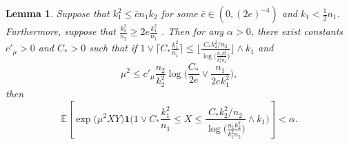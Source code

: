\documentclass{article}
\newcommand{\EE}{\mathbb{E}}
\newcommand{\one}{\mathbf{1}}
\newcommand{\Ct}{C_{*}}
\newcommand{\ju}[1]{{\color{blue}Julien: #1}}
\newtheorem{lemma}{Lemma}
\begin{document}
\begin{lemma}\label{lem_lb_s2d2big_maxlin}
    Suppose that $k_1^2 \leq \bar{c}n_1k_2$ for some $\bar{c} \in (0, (2e)^{-4})$ and $k_1 < \frac12 n_1$. 
    Furthermore, suppose that $\frac{k^2_2}{n_2} \geq 2e\frac{k_1^2}{n_1}$ . Then for any $\alpha > 0$, there exist constants $c'_{\mu} > 0$ and $\Ct > 0$ such that if $1 \vee \lceil \Ct \frac{k_1^2}{n_1}\rceil \leq \big\lfloor \frac{\Ct k_2^2/n_2}{\log\big(\frac{n_1k_2^2}{k_1^2n_2}\big)}\big\rfloor\wedge k_1$ and
    \[\mu^2 \leq c'_\mu \frac{n_2}{k_2^2}\log\big(\frac{\Ct}{2e}\vee \frac{n_1}{2ek^2_1}\big),\]
    then
    \[\EE\left[\exp\big(\mu^2XY\big)\one\bigg(1 \vee \Ct \frac{k_1^2}{n_1} \leq X \leq \frac{\Ct k_2^2/n_2}{\log\big(\frac{n_1k_2^2}{k_1^2n_2}\big)}\wedge k_1\bigg)\right] < \alpha.\]
\end{lemma}
\end{document}
